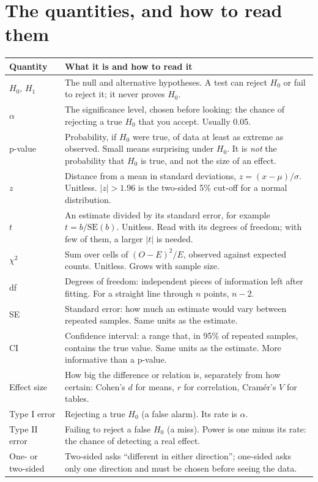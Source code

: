 \section{The quantities, and how to read them}
\begin{tabularx}{\linewidth}{@{}lX@{}}
\toprule
Quantity & What it is and how to read it \\
\midrule
$H_0$, $H_1$ & The null and alternative hypotheses. A test can reject $H_0$ or fail to reject it; it never proves $H_0$. \\
$\alpha$ & The significance level, chosen before looking: the chance of rejecting a true $H_0$ that you accept. Usually 0.05. \\
p-value & Probability, if $H_0$ were true, of data at least as extreme as observed. Small means surprising under $H_0$. It is \emph{not} the probability that $H_0$ is true, and not the size of an effect. \\
$z$ & Distance from a mean in standard deviations, $z = (x-\mu)/\sigma$. Unitless. $|z| > 1.96$ is the two-sided 5\% cut-off for a normal distribution. \\
$t$ & An estimate divided by its standard error, for example $t = b/\mathrm{SE}(b)$. Unitless. Read with its degrees of freedom; with few of them, a larger $|t|$ is needed. \\
$\chi^2$ & Sum over cells of $(O-E)^2/E$, observed against expected counts. Unitless. Grows with sample size. \\
df & Degrees of freedom: independent pieces of information left after fitting. For a straight line through $n$ points, $n-2$. \\
SE & Standard error: how much an estimate would vary between repeated samples. Same units as the estimate. \\
CI & Confidence interval: a range that, in 95\% of repeated samples, contains the true value. Same units as the estimate. More informative than a p-value. \\
Effect size & How big the difference or relation is, separately from how certain: Cohen's $d$ for means, $r$ for correlation, Cram\'er's $V$ for tables. \\
Type I error & Rejecting a true $H_0$ (a false alarm). Its rate is $\alpha$. \\
Type II error & Failing to reject a false $H_0$ (a miss). Power is one minus its rate: the chance of detecting a real effect. \\
One- or two-sided & Two-sided asks ``different in either direction''; one-sided asks only one direction and must be chosen before seeing the data. \\
\bottomrule
\end{tabularx}

